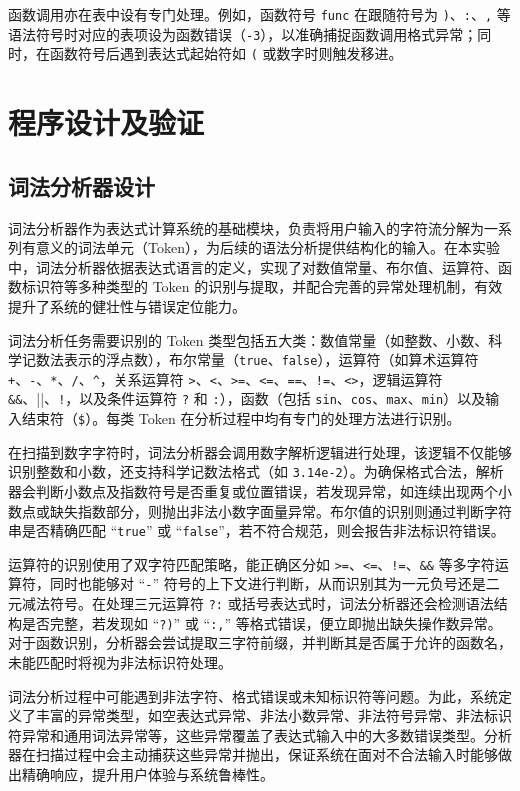 \documentclass[a4paper, twoside, utf8]{ctexart}
\begin{document}
    函数调用亦在表中设有专门处理。例如，函数符号 \verb|func| 在跟随符号为 \verb|)|、\verb|:|、\verb|,| 等语法符号时对应的表项设为函数错误（\verb|-3|），以准确捕捉函数调用格式异常；同时，在函数符号后遇到表达式起始符如 \verb|(| 或数字时则触发移进。

    \section{程序设计及验证}

    \subsection{词法分析器设计}

    词法分析器作为表达式计算系统的基础模块，负责将用户输入的字符流分解为一系列有意义的词法单元（Token），为后续的语法分析提供结构化的输入。在本实验中，词法分析器依据表达式语言的定义，实现了对数值常量、布尔值、运算符、函数标识符等多种类型的 Token 的识别与提取，并配合完善的异常处理机制，有效提升了系统的健壮性与错误定位能力。

    词法分析任务需要识别的 Token 类型包括五大类：数值常量（如整数、小数、科学记数法表示的浮点数），布尔常量（\verb|true|、\verb|false|），运算符（如算术运算符 \verb|+|、\verb|-|、\verb|*|、\verb|/|、\verb|^|，关系运算符 \verb|>|、\verb|<|、\verb|>=|、\verb|<=|、\verb|==|、\verb|!=|、\verb|<>|，逻辑运算符 \verb|&&|、\verb||||、\verb|!|，以及条件运算符 \verb|?| 和 \verb|:|），函数（包括 \verb|sin|、\verb|cos|、\verb|max|、\verb|min|）以及输入结束符（\verb|$|）。每类 Token 在分析过程中均有专门的处理方法进行识别。

    在扫描到数字字符时，词法分析器会调用数字解析逻辑进行处理，该逻辑不仅能够识别整数和小数，还支持科学记数法格式（如 \verb|3.14e-2|）。为确保格式合法，解析器会判断小数点及指数符号是否重复或位置错误，若发现异常，如连续出现两个小数点或缺失指数部分，则抛出非法小数字面量异常。布尔值的识别则通过判断字符串是否精确匹配 “\verb|true|” 或 “\verb|false|”，若不符合规范，则会报告非法标识符错误。

    运算符的识别使用了双字符匹配策略，能正确区分如 \verb|>=|、\verb|<=|、\verb|!=|、\verb|&&| 等多字符运算符，同时也能够对 “\verb|-|” 符号的上下文进行判断，从而识别其为一元负号还是二元减法符号。在处理三元运算符 \verb|?:| 或括号表达式时，词法分析器还会检测语法结构是否完整，若发现如 “\verb|?)|” 或 “\verb|:,|” 等格式错误，便立即抛出缺失操作数异常。对于函数识别，分析器会尝试提取三字符前缀，并判断其是否属于允许的函数名，未能匹配时将视为非法标识符处理。

    词法分析过程中可能遇到非法字符、格式错误或未知标识符等问题。为此，系统定义了丰富的异常类型，如空表达式异常、非法小数异常、非法符号异常、非法标识符异常和通用词法异常等，这些异常覆盖了表达式输入中的大多数错误类型。分析器在扫描过程中会主动捕获这些异常并抛出，保证系统在面对不合法输入时能够做出精确响应，提升用户体验与系统鲁棒性。
\end{document}
